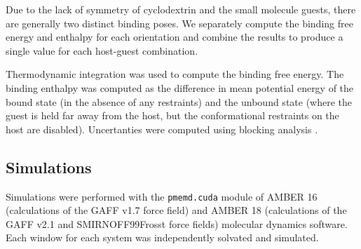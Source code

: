 \documentclass[9pt,lineno]{elife}
\begin{document}
Due to the lack of symmetry of cyclodextrin and the small molecule guests, there are generally two distinct binding poses. We separately compute the binding free energy and enthalpy for each orientation \cite{henriksen_computational_2015} and combine the results to produce a single value for each host-guest combination.

Thermodynamic integration was used to compute the binding free energy. The binding enthalpy was computed as the difference in mean potential energy of the bound state (in the absence of any restraints) and the unbound state (where the guest is held far away from the host, but the conformational restraints on the host are disabled).
Uncertanties were computed using blocking analysis \cite{flyvbjerg_error_1989}.

\subsection{Simulations}
Simulations were performed with the \texttt{pmemd.cuda} module of AMBER 16 (calculations of the GAFF v1.7 force field) and AMBER 18 (calculations of the GAFF v2.1 and SMIRNOFF99Frosst force fields) molecular dynamics software. Each window for each system was independently solvated and simulated.
\end{document}
